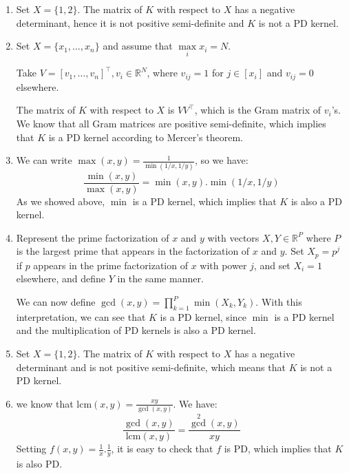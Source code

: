 \documentclass[12pt]{article}
\begin{document}
\begin{bx}
\begin{enumerate}
\item Set $X=\{1,2\}$. The matrix of $K$ with respect to $X$ has a negative determinant, hence it is not positive semi-definite and $K$ is not a PD kernel.

\item Set $X=\{x_1,\dots,x_n\}$ and assume that $\max\limits_{i} x_i=N$.

 Take
 $V=[v_1,\dots,v_n]^\top, v_i\in \mathbb{R}^N$, where $v_{ij}=1$ for $j\in[x_i]$ and $v_{ij}=0$ elsewhere.
 
 The matrix of $K$ with respect to $X$ is $VV^\top$, which is the Gram matrix of $v_i$'s. We know that all Gram matrices are positive semi-definite, which implies that $K$ is a PD kernel according to Mercer's theorem.
 
 \item We can write $\max(x,y)=\frac{1}{\min(1/x,1/y)}$, so we have:
 \[
 \frac{\min(x,y)}{\max(x,y)}=\min(x,y).\min(1/x,1/y)
 \]
 As we showed above, $\min$ is a PD kernel, which implies that $K$ is also a PD kernel.
 
 
 \item Represent the prime factorization of $x$ and $y$ with vectors $X,Y \in \mathbb{R}^P$ where $P$ is the largest prime that appears in the factorization of $x$ and $y$.
 Set $X_p=p^j$ if $p$ appears in the prime factorization of $x$ with power $j$, and set $X_i=1$ elsewhere, and define $Y$ in the same manner.
 
 We can now define $\gcd(x,y)=\prod_{k=1}^{P}\min(X_k,Y_k)$. With this interpretation, we can see that $K$ is a PD kernel, since $\min$ is a PD kernel and the multiplication of PD kernels is also a PD kernel. 
 
 \item Set $X=\{1,2\}$. The matrix of $K$ with respect to $X$ has a negative determinant and is not positive semi-definite, which means that $K$ is not a PD kernel.
 
 \item we know that $\mathrm{lcm}(x,y)=\frac{xy}{\gcd(x,y)}$. We have:
 \[
 \frac{\gcd(x,y)}{\mathrm{lcm}(x,y)}=\frac{\gcd^2(x,y)
 }{xy}
 \]
 Setting $f(x,y)=\frac{1}{x}.\frac{1}{y}$, it is easy to check that $f$ is PD, which implies that $K$ is also PD.
\end{enumerate}
	\end{bx}
	
	
\end{document}
